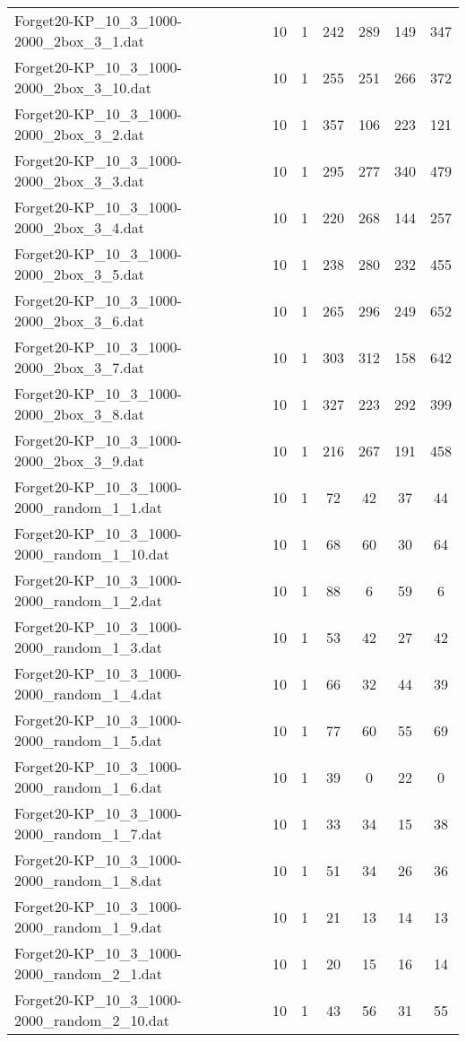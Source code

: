\begin{table}[!ht]
\begin{tabular}{lcccccc}
Forget20-KP\_10\_3\_1000-2000\_2box\_3\_1.dat & 10 & 1 & 242 & 289 & 149 & 347 \\
Forget20-KP\_10\_3\_1000-2000\_2box\_3\_10.dat & 10 & 1 & 255 & 251 & 266 & 372 \\
Forget20-KP\_10\_3\_1000-2000\_2box\_3\_2.dat & 10 & 1 & 357 & 106 & 223 & 121 \\
Forget20-KP\_10\_3\_1000-2000\_2box\_3\_3.dat & 10 & 1 & 295 & 277 & 340 & 479 \\
Forget20-KP\_10\_3\_1000-2000\_2box\_3\_4.dat & 10 & 1 & 220 & 268 & 144 & 257 \\
Forget20-KP\_10\_3\_1000-2000\_2box\_3\_5.dat & 10 & 1 & 238 & 280 & 232 & 455 \\
Forget20-KP\_10\_3\_1000-2000\_2box\_3\_6.dat & 10 & 1 & 265 & 296 & 249 & 652 \\
Forget20-KP\_10\_3\_1000-2000\_2box\_3\_7.dat & 10 & 1 & 303 & 312 & 158 & 642 \\
Forget20-KP\_10\_3\_1000-2000\_2box\_3\_8.dat & 10 & 1 & 327 & 223 & 292 & 399 \\
Forget20-KP\_10\_3\_1000-2000\_2box\_3\_9.dat & 10 & 1 & 216 & 267 & 191 & 458 \\
Forget20-KP\_10\_3\_1000-2000\_random\_1\_1.dat & 10 & 1 & 72 & 42 & 37 & 44 \\
Forget20-KP\_10\_3\_1000-2000\_random\_1\_10.dat & 10 & 1 & 68 & 60 & 30 & 64 \\
Forget20-KP\_10\_3\_1000-2000\_random\_1\_2.dat & 10 & 1 & 88 & 6 & 59 & 6 \\
Forget20-KP\_10\_3\_1000-2000\_random\_1\_3.dat & 10 & 1 & 53 & 42 & 27 & 42 \\
Forget20-KP\_10\_3\_1000-2000\_random\_1\_4.dat & 10 & 1 & 66 & 32 & 44 & 39 \\
Forget20-KP\_10\_3\_1000-2000\_random\_1\_5.dat & 10 & 1 & 77 & 60 & 55 & 69 \\
Forget20-KP\_10\_3\_1000-2000\_random\_1\_6.dat & 10 & 1 & 39 & 0 & 22 & 0 \\
Forget20-KP\_10\_3\_1000-2000\_random\_1\_7.dat & 10 & 1 & 33 & 34 & 15 & 38 \\
Forget20-KP\_10\_3\_1000-2000\_random\_1\_8.dat & 10 & 1 & 51 & 34 & 26 & 36 \\
Forget20-KP\_10\_3\_1000-2000\_random\_1\_9.dat & 10 & 1 & 21 & 13 & 14 & 13 \\
Forget20-KP\_10\_3\_1000-2000\_random\_2\_1.dat & 10 & 1 & 20 & 15 & 16 & 14 \\
Forget20-KP\_10\_3\_1000-2000\_random\_2\_10.dat & 10 & 1 & 43 & 56 & 31 & 55 \\

\end{tabular}
\end{table}

